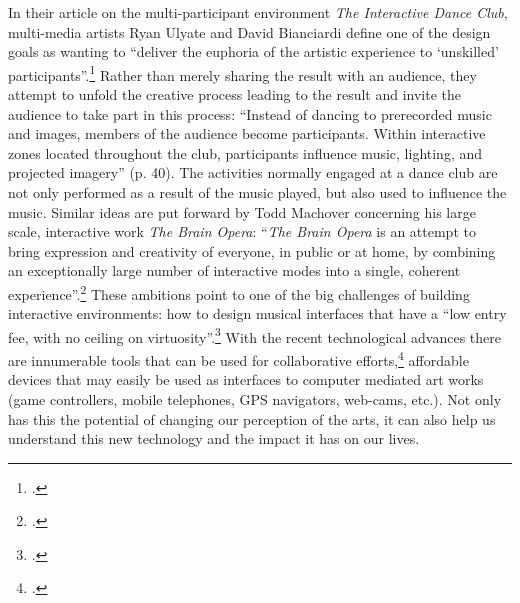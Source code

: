 In their article on the multi-participant environment \emph{The   Interactive Dance Club}, multi-media artists Ryan Ulyate and David Bianciardi define one of the design goals as wanting to ``deliver the euphoria of the artistic experience to `unskilled' participants''.\footcite[41]{ulyate} Rather than merely sharing the result with an audience, they attempt to unfold the creative process leading to the result and invite the audience to take part in this process: ``Instead of dancing to prerecorded music and images, members of the audience become participants. Within interactive zones located throughout the club, participants influence music, lighting, and projected imagery'' (p. 40). The activities normally engaged at a dance club are not only performed as a result of the music played, but also used to influence the music. Similar ideas are put forward by Todd Machover concerning his large scale, interactive work \emph{The Brain Opera}: ``\emph{The Brain Opera} is an attempt to bring expression and creativity of everyone, in public or at home, by combining an exceptionally large number of interactive modes into a single, coherent experience''.\footcite[Machover, 1996, as quoted in][p. 360]{rowe01} These ambitions point to one of the big challenges of building interactive environments: how to design musical interfaces that have a ``low entry fee, with no ceiling on virtuosity''.\footcites{wessel}{jorda02}[See also][]{rowe}{auracle} With the recent technological advances there are innumerable tools that can be used for collaborative efforts,\footcite{barbosa02} affordable devices that may easily be used as interfaces to computer mediated art works (game controllers, mobile telephones, GPS navigators, web-cams, etc.). Not only has this the potential of changing our perception of the arts, it can also help us understand this new technology and the impact it has on our lives.

